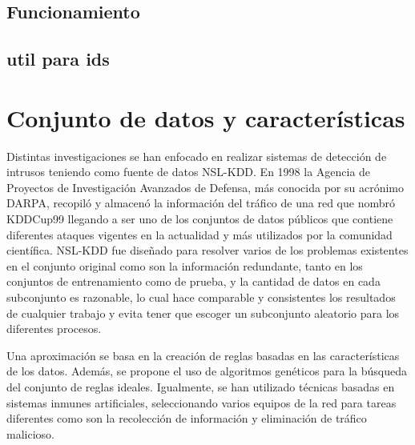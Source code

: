 
\subsection{Funcionamiento}


\subsection{util para ids}





\section{Conjunto de datos y características}
Distintas investigaciones se han enfocado en realizar sistemas de detección de intrusos teniendo como fuente de datos NSL-KDD. En 1998 la Agencia de Proyectos de Investigación Avanzados de Defensa, más conocida por su acrónimo DARPA, recopiló y almacenó la información del tráfico de una red que nombró KDDCup99 llegando a ser uno de los conjuntos de datos públicos que contiene diferentes ataques vigentes en la actualidad y más utilizados por la comunidad científica. NSL-KDD fue diseñado para resolver varios de los problemas existentes en el conjunto original como son la información redundante, tanto en los conjuntos de entrenamiento como de prueba, y la cantidad de datos en cada subconjunto es razonable, lo cual hace comparable y consistentes los resultados de cualquier trabajo y evita tener que escoger un subconjunto aleatorio para los diferentes procesos.

Una aproximación se basa en la creación de reglas basadas en las características de los datos. Además, se propone el uso de algoritmos genéticos para la búsqueda del conjunto de reglas ideales. Igualmente, se han utilizado técnicas basadas en sistemas inmunes artificiales, seleccionando varios equipos de la red para tareas diferentes como son la recolección de información y eliminación de tráfico malicioso.

